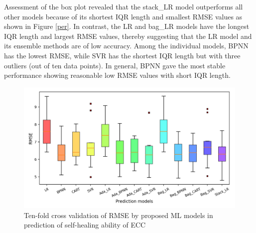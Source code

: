 \documentclass[11pt]{article}
\begin{document}
	
	Assessment of the box plot revealed that the stack\_LR model outperforms all other models because of its shortest IQR length and smallest RMSE values as shown in Figure \ref{per}. In contrast, the LR and bag\_LR models have the longest IQR length and largest RMSE values, thereby suggesting that the LR model and its ensemble methods are of low accuracy. Among the individual models, BPNN has the lowest RMSE, while SVR has the shortest IQR length but with three outliers (out of ten data points). In general, BPNN gave the most stable performance showing reasonable low RMSE values with short IQR length. 
	
	
	
	\begin{figure}[!h]
		\centering
		\includegraphics[width=\textwidth]{boxRMSE.png}
		\caption{Ten-fold cross validation of RMSE by proposed ML models in prediction of self-healing ability of ECC}
		\label{bar}
	\end{figure}
	
	
	
\end{document}
